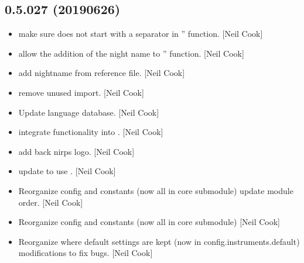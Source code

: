 \documentclass[a4paper,10pt,english]{report}
\begin{document}
\subsection{0.5.027 (2019\sphinxhyphen{}06\sphinxhyphen{}26)}
\label{\detokenize{misc/changelog:id129}}\begin{itemize}
\item {} 
 \sphinxhyphen{} make sure  does not start with a separator in
” function. {[}Neil Cook{]}

\item {} 
 \sphinxhyphen{} allow the addition of the night name to ”
function. {[}Neil Cook{]}

\item {} 
 \sphinxhyphen{} add nightname from reference file. {[}Neil
Cook{]}

\item {} 
 \sphinxhyphen{} remove unused import. {[}Neil Cook{]}

\item {} 
Update language database. {[}Neil Cook{]}

\item {} 
 \sphinxhyphen{} integrate  functionality into .
{[}Neil Cook{]}

\item {} 
 \sphinxhyphen{} add back nirps logo. {[}Neil Cook{]}

\item {} 
 \sphinxhyphen{} update  to use . {[}Neil
Cook{]}

\item {} 
Reorganize config and constants (now all in core sub\sphinxhyphen{}module) \sphinxhyphen{} update
module order. {[}Neil Cook{]}

\item {} 
Reorganize config and constants (now all in core sub\sphinxhyphen{}module) {[}Neil
Cook{]}

\item {} 
Reorganize where default settings are kept (now in
config.instruments.default) \textendash{} modifications to fix bugs. {[}Neil Cook{]}


\end{itemize}
\end{document}
